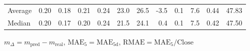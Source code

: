 \begin{threeparttable}
{\begin{tabular}{lrrrrrrrrrrr}
Average &          0.20 &          0.18 &          0.21 &        0.24 &                23.0 &                26.5 &       -3.5 &                 0.1 &              7.6 &            0.44 &                  47.83 \\
 Median &          0.20 &          0.17 &          0.20 &        0.24 &                21.5 &                24.1 &        0.4 &                 0.1 &              7.5 &            0.42 &                  47.50 \\
\bottomrule
\end{tabular}
}
\begin{tablenotes}\footnotesize
\item $m_\Delta=m_{\text{pred}}-m_{\text{real}}$,
$\mathrm{MAE}_5=\mathrm{MAE}_{5\text{d}}$,
$\mathrm{RMAE}=\mathrm{MAE}_5/\text{Close}$
\end{tablenotes}
\end{threeparttable}
\endgroup

